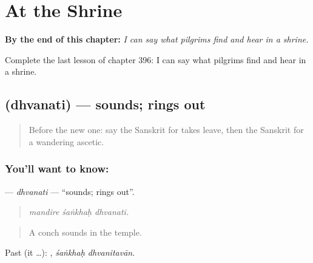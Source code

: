 
\chapter{At the Shrine}
\label{ch:sa-at-the-shrine}

\begin{chapteropening}
\textbf{By the end of this chapter:} \emph{I can say what pilgrims find and hear in a shrine.}

Complete the last lesson of chapter 396: I can say what pilgrims find and hear in a shrine.
\end{chapteropening}

\section[\texorpdfstring{\sk{ध्वनति} (dhvanati)}{ध्वनति (dhvanati)}]{ (dhvanati) — sounds; rings out}

\label{lesson:SA-C396-dhvanati}



\begin{quote}
Before the new one: say the Sanskrit for takes leave, then the Sanskrit for a wandering ascetic.
\end{quote}

\subsection*{You'll want to know: }
\textbf{} — \emph{dhvanati} — \textquotedblleft{}sounds; rings out\textquotedblright{}.

\begin{quote}
  
\end{quote}

\begin{quote}
\emph{mandire śaṅkhaḥ dhvanati.}
\end{quote}

\begin{quote}
A conch sounds in the temple.
\end{quote}

Past (it …):  , \emph{śaṅkhaḥ dhvanitavān}.

